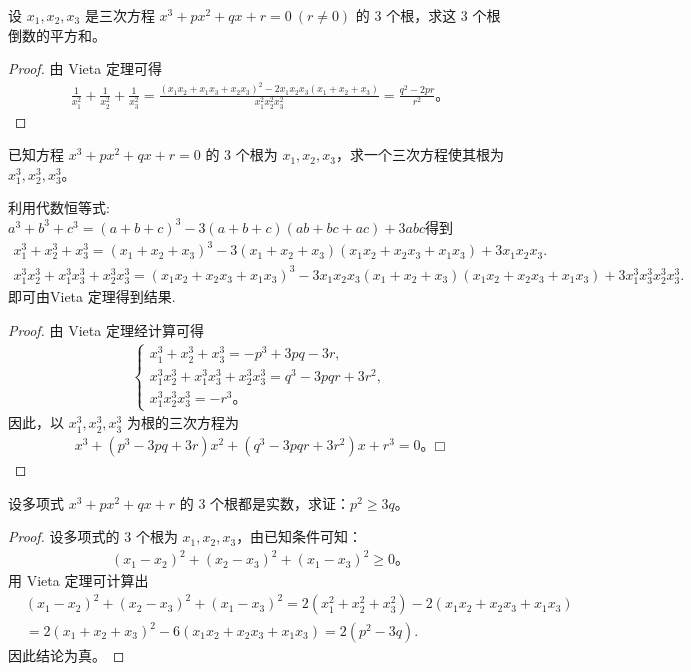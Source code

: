 \documentclass[../../main.tex]{subfiles}%
\begin{document}
\begin{example}
设 $x_1, x_2, x_3$ 是三次方程 $x^3 + px^2 + qx + r = 0 \ (r \neq 0)$ 的 3 个根，求这 3 个根倒数的平方和。
\end{example}
\begin{proof}
由 Vieta 定理可得
\begin{align*}
\frac{1}{x_1^2} + \frac{1}{x_2^2} + \frac{1}{x_3^2} = \frac{(x_1 x_2 + x_1 x_3 + x_2 x_3)^2 - 2x_1 x_2 x_3 (x_1 + x_2 + x_3)}{x_1^2 x_2^2 x_3^2}= \frac{q^2 - 2pr}{r^2}。
\end{align*}
\end{proof}

\begin{example}
已知方程 $x^3 + px^2 + qx + r = 0$ 的 3 个根为 $x_1, x_2, x_3$，求一个三次方程使其根为 $x_1^3, x_2^3, x_3^3$。
\end{example}
\begin{note}
利用代数恒等式:$a^3+b^3+c^3=\left( a+b+c \right) ^3-3\left( a+b+c \right) \left( ab+bc+ac \right) +3abc$得到
\begin{gather*}
x_{1}^{3}+x_{2}^{3}+x_{3}^{3}=\left( x_1+x_2+x_3 \right) ^3-3\left( x_1+x_2+x_3 \right) \left( x_1x_2+x_2x_3+x_1x_3 \right) +3x_1x_2x_3.
\\
x_{1}^{3}x_{2}^{3}+x_{1}^{3}x_{3}^{3}+x_{2}^{3}x_{3}^{3}=\left( x_1x_2+x_2x_3+x_1x_3 \right) ^3-3x_1x_2x_3\left( x_1+x_2+x_3 \right) \left( x_1x_2+x_2x_3+x_1x_3 \right) +3x_{1}^{3}x_{3}^{3}x_{2}^{3}x_{3}^{3}.
\end{gather*}
即可由Vieta 定理得到结果.
\end{note}
\begin{proof}
由 Vieta 定理经计算可得
\begin{align*}
\begin{cases}
x_1^3 + x_2^3 + x_3^3 = -p^3 + 3pq - 3r, \\
x_1^3 x_2^3 + x_1^3 x_3^3 + x_2^3 x_3^3 = q^3 - 3pqr + 3r^2, \\
x_1^3 x_2^3 x_3^3 = -r^3。
\end{cases}
\end{align*}
因此，以 $x_1^3, x_2^3, x_3^3$ 为根的三次方程为
\begin{align*}
x^3 + (p^3 - 3pq + 3r)x^2 + (q^3 - 3pqr + 3r^2)x + r^3 = 0。□
\end{align*}
\end{proof}

\begin{example}
设多项式 $x^3 + px^2 + qx + r$ 的 3 个根都是实数，求证：$p^2 \geqslant  3q$。
\end{example}
\begin{proof}
设多项式的 3 个根为 $x_1, x_2, x_3$，由已知条件可知：
\begin{align*}
(x_1 - x_2)^2 + (x_2 - x_3)^2 + (x_1 - x_3)^2 \geqslant  0。
\end{align*}
用 Vieta 定理可计算出
\begin{align*}
&(x_1-x_2)^2+(x_2-x_3)^2+(x_1-x_3)^2=2\left( x_{1}^{2}+x_{2}^{2}+x_{3}^{2} \right) -2\left( x_1x_2+x_2x_3+x_1x_3 \right) 
\\
&=2\left( x_1+x_2+x_3 \right) ^2-6\left( x_1x_2+x_2x_3+x_1x_3 \right) =2(p^2-3q).
\end{align*}
因此结论为真。
\end{proof}
\end{document}
